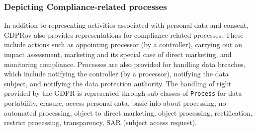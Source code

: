 \subsubsection{Depicting Compliance-related processes}
In addition to representing activities associated with personal data and consent, GDPRov also provides representations for compliance-related processes.
These include actions such as appointing processor (by a controller), carrying out an impact assessment, marketing and its special case of direct marketing, and monitoring compliance.
Processes are also provided for handling data breaches, which include notifying the controller (by a processor), notifying the data subject, and notifying the data protection authority.
The handling of right provided by the GDPR is represented through sub-classes of \texttt{Process} for data portability, erasure, access personal data, basic info about processing, no automated processing, object to direct marketing, object processing, rectification, restrict processing, transparency, SAR (subject access request).



